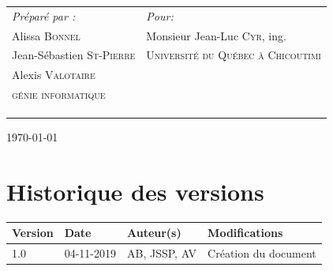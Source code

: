 \documentclass[12pt]{article}
\begin{document}
\begin{titlepage}
   
  	\begin{onehalfspacing}
    \begin{table}[H]
    \begin{tabular}{l l}

        \large \emph{Préparé par :} & \quad \quad \quad \large \emph{Pour:} \\
    	Alissa \textsc{Bonnel} & \quad \quad \quad Monsieur Jean-Luc \textsc{Cyr}, ing. \\
        Jean-Sébastien \textsc{St-Pierre} & \quad \quad \quad \textsc{Université du Québec à Chicoutimi} \\
        Alexis \textsc{Valotaire} \\
        \textsc{génie informatique}  \\ \\ \\ \\
    
    \end{tabular}
	\end{table}
	\end{onehalfspacing}
   


    {\large \today} %
    
    \vfill %


\end{titlepage}


\newpage
\section*{Historique des versions}
\begin{table}[H]
    \begin{tabular}{|l|l|l|p{7.6cm}|}
        \hline
        \textbf{Version} & \textbf{Date} & \textbf{Auteur(s)} & \textbf{Modifications} \\ \hline
        1.0 & 04-11-2019 & AB, JSSP, AV & Création du document \\ \hline
    \end{tabular}
\end{table}
\end{document}
